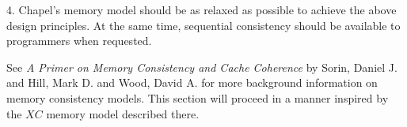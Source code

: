 4. Chapel's memory model should be as relaxed as possible to achieve the above design principles. At the same time, sequential consistency should be available to programmers when requested.

See \textit{A Primer on Memory Consistency and Cache Coherence} by Sorin,
Daniel J. and Hill, Mark D. and Wood, David A. for more background information
on memory consistency models. This section will proceed in a manner inspired by the $XC$ memory model described there.


%
%


